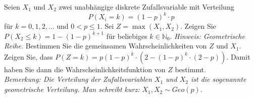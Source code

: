\begin{Exercise}
	Seien $X_1$ und $X_2$ zwei unabhängige diskrete Zufallsvariable mit Verteilung
	\begin{equation*}
		P(X_i=k)=(1-p)^k\cdot p
	\end{equation*}
	für $k=0,1,2,\dots$ und $0< p\leq 1$. Sei $Z=\max(X_1,X_2)$.
	\Question Zeigen Sie $P(X_2\leq k)=1-(1-p)^{k+1}$ für beliebiges $k\in\mathbb{N}_0$. \textit{Hinweis: Geometrische Reihe.}
	\Question Bestimmen Sie die gemeinsamen Wahrscheinlichkeiten von $Z$ und $X_1$.
	\Question Zeigen Sie, dass $P(Z=k)=p(1-p)^k\cdot\left(2-(1-p)^k\cdot(2 - p)\right)$. Damit haben Sie dann die Wahrscheinlichkeitsfunktion von $Z$ bestimmt.\\
	\textit{Bemerkung: Die Verteilung der Zufallsvariablen $X_1$ und $X_2$ ist die sogenannte geometrische Verteilung. Man schreibt kurz: $X_1,X_2\sim Geo(p)$.}
\end{Exercise}

